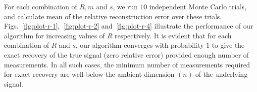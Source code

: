 For each combination of $R, m$ and $s$, we run $10$ independent Monte Carlo trials, and calculate mean of the relative reconstruction error over these trials. Figs.~\ref{fig:plot-r-1},~\ref{fig:plot-r-2} and~\ref{fig:plot-r-4} illustrate the performance of our algorithm for increasing values of $R$ respectively. It is evident that for each combination of $R$ and $s$, our algorithm converges with probability $1$ to give the exact recovery of the true signal (zero relative error) provided enough number of measurements. In all such cases, the minimum number of measurements required for exact recovery are well below the ambient dimension $(n)$ of the underlying signal. 

